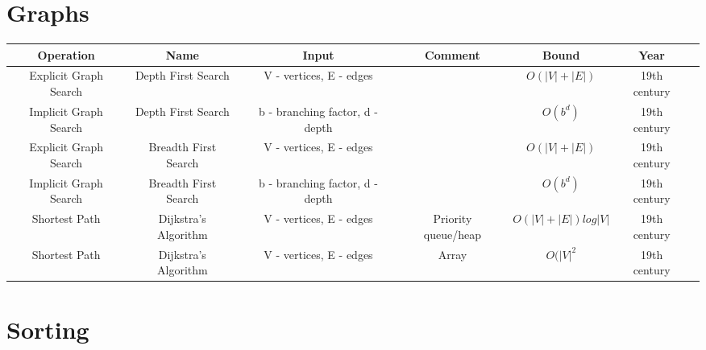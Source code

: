 \documentclass{article}
\begin{document}
\newpage
\section*{Graphs}

\begin{table}[ht]
	\centering
	\begin{tabular}{c cccccc}
		Operation & Name & Input & Comment & Bound & Year\\
		\hline
		Explicit Graph Search & Depth First Search & V - vertices, E - edges &  & $O(|V| + |E|)$ & 19th century\\
		Implicit Graph Search & Depth First Search & b - branching factor, d - depth & & $O(b^d)$ & 19th century\\
		Explicit Graph Search & Breadth First Search & V - vertices, E - edges & & $O(|V| + |E|)$ & 19th century\\
		Implicit Graph Search & Breadth First Search & b - branching factor, d - depth & & $O(b^d)$ & 19th century\\
		Shortest Path & Dijkstra's Algorithm & V - vertices, E - edges & Priority queue/heap & $O(|V| + |E|)log|V|$ & 19th century\\
		Shortest Path & Dijkstra's Algorithm & V - vertices, E - edges & Array & $O(|V|^2$ & 19th century\\
		\hline
	\end{tabular}
\end{table}

\newpage
\section*{Sorting}
\end{document}
